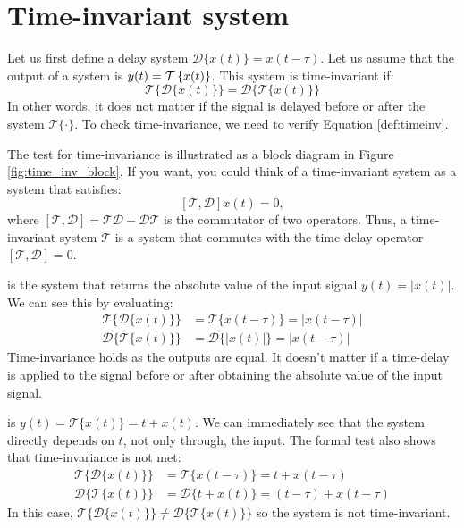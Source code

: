 \section{Time-invariant system}

Let us first define a delay system $\mathcal{D}\{x(t)\} = x(t-\tau)$. Let us assume that the output of a system is $y(t) = \spop[x(t)]$. This system is time-invariant if:
\begin{equation}
\boxed{
\mathcal{T}\{\mathcal{D}\{x(t)\}\} = \mathcal{D}\{\mathcal{T}\{x(t)\}\}
\label{def:timeinv}
}
\end{equation}
In other words, it does not matter if the signal is delayed before or after the system $\mathcal{T}\{\cdot\}$. To check time-invariance, we need to verify Equation \ref{def:timeinv}. 

The test for time-invariance is illustrated as a block diagram in Figure \ref{fig:time_inv_block}. 
If you want, you could think of a time-invariant system as a system that satisfies:
$$[\mathcal{T},\mathcal{D}]x(t)=0,$$
where $[\mathcal{T},\mathcal{D}]=\mathcal{T}\mathcal{D}-\mathcal{D}\mathcal{T}$ is the commutator of two operators. 
Thus, a time-invariant system $\mathcal{T}$ is a system that commutes with the time-delay operator $[\mathcal{T},\mathcal{D}]=0$. 

 is the system that returns the absolute value of the input signal $y(t)=|x(t)|$. We can see this by evaluating:
\begin{align}
\mathcal{T}\{\mathcal{D}\{x(t)\}\} &= \mathcal{T}\{x(t-\tau)\}=|x(t-\tau)|\\
\mathcal{D}\{\mathcal{T}\{x(t)\}\} &= \mathcal{D}\{|x(t)|\}=|x(t-\tau)|
\end{align}
Time-invariance holds as the outputs are equal. It doesn't matter if a time-delay is applied to the signal before or after obtaining the absolute value of the input signal.

 is $y(t) = \mathcal{T}\{x(t)\} = t + x(t)$. We can immediately see that the system directly depends on $t$, not only through, the input. 
The formal test also shows that time-invariance is not met:
\begin{align}
\mathcal{T}\{\mathcal{D}\{x(t)\}\} &= \mathcal{T}\{x(t-\tau)\}=t+x(t-\tau) \\
\mathcal{D}\{\mathcal{T}\{x(t)\}\} &= \mathcal{D}\{t + x(t)\}=(t-\tau)+x(t-\tau)
\end{align}
In this case, $\mathcal{T}\{\mathcal{D}\{x(t)\}\}\neq\mathcal{D}\{\mathcal{T}\{x(t)\}\}$ so the system is not time-invariant.

